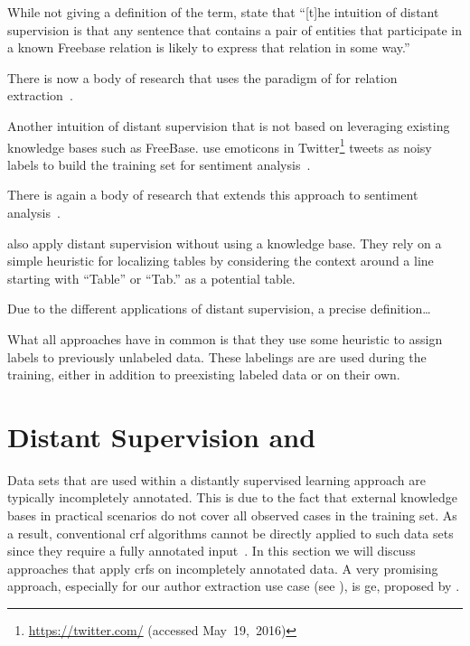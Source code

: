 While not giving a definition of the term, \citet{mintz2009distant} state that ``[t]he intuition of distant supervision is that any sentence that contains a pair of entities that participate in a known Freebase relation is likely to express that relation in some way.''

There is now a body of research that uses the paradigm of \citet{mintz2009distant} for relation extraction~\citep{benson2011event,ritter2011named,nguyen2011end,takamatsu2012reducing,xu2013filling}.

\bigskip

Another intuition of \gls{distant supervision} that is not based on leveraging existing knowledge bases such as FreeBase.
\citet{go2009twitter} use emoticons in Twitter\footnote{\url{https://twitter.com/} (accessed May~19,~2016)} tweets as noisy labels to build the training set for sentiment analysis~\citep{go2009twitter}.

There is again a body of research that extends this approach to sentiment analysis~\citep{purver2012experimenting,marchetti2012learning,suttles2013distant}.

\citet{fan2015detecting} also apply distant supervision without using a knowledge base.
They rely on a simple heuristic for localizing tables by considering the context around a line starting with ``Table'' or ``Tab.'' as a potential table.

\bigskip

Due to the different applications of \gls{distant supervision}, a precise definition\dots

What all approaches have in common is that they use some heuristic to assign labels to previously unlabeled data. These labelings are are used during the training, either in addition to preexisting labeled data or on their own.



\section{Distant Supervision and }

Data sets that are used within a distantly supervised learning approach are typically incompletely annotated.
This is due to the fact that external knowledge bases in practical scenarios do not cover all observed cases in the training set.
As a result, conventional \gls{crf} algorithms cannot be directly applied to such data sets since they require a fully annotated input~\citep{tsuboi2008training}.
In this section we will discuss approaches that apply \glspl{crf} on incompletely annotated data.
A very promising approach, especially for our author extraction use case (see ), is \gls{ge}, proposed by \citet{mann2007simple}.

